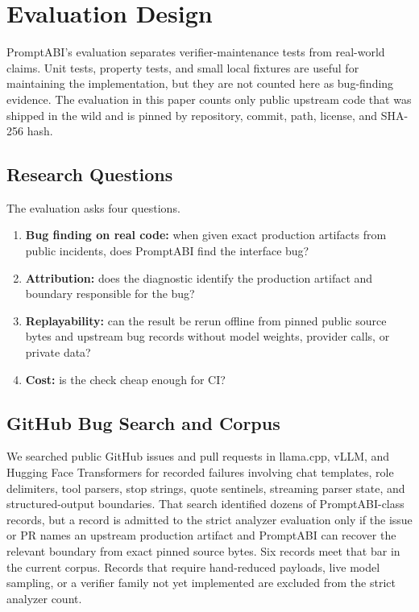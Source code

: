 \documentclass[10pt]{article}
\begin{document}
\newpage
\section{Evaluation Design}
\label{sec:eval}

PromptABI's evaluation separates verifier-maintenance tests from real-world
claims. Unit tests, property tests, and small local fixtures are useful for
maintaining the implementation, but they are not counted here as bug-finding
evidence. The evaluation in this paper counts only public upstream code that was
shipped in the wild and is pinned by repository, commit, path, license, and
SHA-256 hash.

\subsection{Research Questions}

The evaluation asks four questions.
\begin{enumerate}
  \item \textbf{Bug finding on real code:} when given exact production artifacts
  from public incidents, does PromptABI find the interface bug?
  \item \textbf{Attribution:} does the diagnostic identify the production
  artifact and boundary responsible for the bug?
  \item \textbf{Replayability:} can the result be rerun offline from pinned
  public source bytes and upstream bug records without model weights, provider
  calls, or private data?
  \item \textbf{Cost:} is the check cheap enough for CI?
\end{enumerate}

\subsection{GitHub Bug Search and Corpus}

We searched public GitHub issues and pull requests in llama.cpp, vLLM, and
Hugging Face Transformers for recorded failures involving chat templates, role
delimiters, tool parsers, stop strings, quote sentinels, streaming parser state,
and structured-output boundaries. That search identified dozens of
PromptABI-class records, but a record is admitted to the strict analyzer
evaluation only if the issue or PR names an upstream production artifact and
PromptABI can recover the relevant boundary from exact pinned source bytes. Six
records meet that bar in the current corpus. Records that require hand-reduced
payloads, live model sampling, or a verifier family not yet implemented are
excluded from the strict analyzer count.
\end{document}
